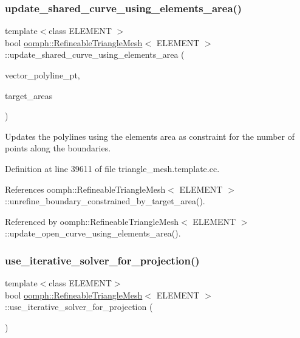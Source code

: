 \subsubsection{\texorpdfstring{update\+\_\+shared\+\_\+curve\+\_\+using\+\_\+elements\+\_\+area()}{update\_shared\_curve\_using\_elements\_area()}}
{\footnotesize\ttfamily template$<$class E\+L\+E\+M\+E\+NT $>$ \\
bool \hyperlink{classoomph_1_1RefineableTriangleMesh}{oomph\+::\+Refineable\+Triangle\+Mesh}$<$ E\+L\+E\+M\+E\+NT $>$\+::update\+\_\+shared\+\_\+curve\+\_\+using\+\_\+elements\+\_\+area (\begin{DoxyParamCaption}\item[{Vector$<$ Triangle\+Mesh\+Poly\+Line $\ast$$>$ \&}]{vector\+\_\+polyline\+\_\+pt,  }\item[{const Vector$<$ double $>$ \&}]{target\+\_\+areas }\end{DoxyParamCaption})\hspace{0.3cm}{\ttfamily [protected]}}



Updates the polylines using the elements area as constraint for the number of points along the boundaries. 



Definition at line 39611 of file triangle\+\_\+mesh.\+template.\+cc.



References oomph\+::\+Refineable\+Triangle\+Mesh$<$ E\+L\+E\+M\+E\+N\+T $>$\+::unrefine\+\_\+boundary\+\_\+constrained\+\_\+by\+\_\+target\+\_\+area().



Referenced by oomph\+::\+Refineable\+Triangle\+Mesh$<$ E\+L\+E\+M\+E\+N\+T $>$\+::update\+\_\+open\+\_\+curve\+\_\+using\+\_\+elements\+\_\+area().

\mbox{\label{classoomph_1_1RefineableTriangleMesh_ae2f0885e6e3fc4c0566986d9c8d2fe65}} 
\subsubsection{\texorpdfstring{use\+\_\+iterative\+\_\+solver\+\_\+for\+\_\+projection()}{use\_iterative\_solver\_for\_projection()}}
{\footnotesize\ttfamily template$<$class E\+L\+E\+M\+E\+NT$>$ \\
bool \hyperlink{classoomph_1_1RefineableTriangleMesh}{oomph\+::\+Refineable\+Triangle\+Mesh}$<$ E\+L\+E\+M\+E\+NT $>$\+::use\+\_\+iterative\+\_\+solver\+\_\+for\+\_\+projection (\begin{DoxyParamCaption}{ }\end{DoxyParamCaption})\hspace{0.3cm}{\ttfamily [inline]}}



